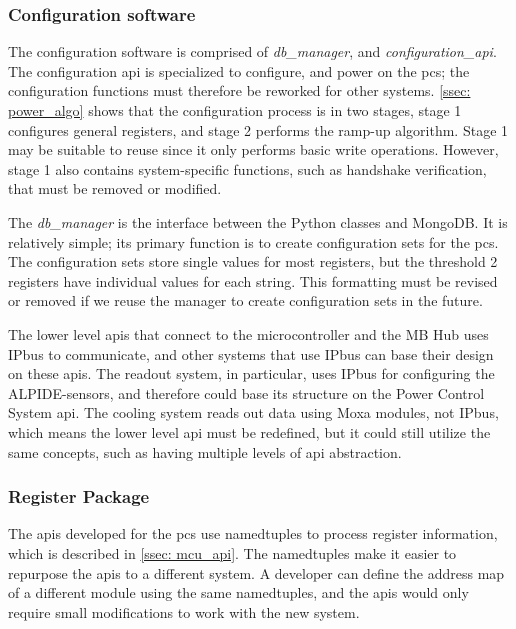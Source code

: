 \documentclass[main.tex]{subfiles}
\begin{document}
\subsubsection{Configuration software}

The configuration software is comprised of \textit{db\_manager}, and \textit{configuration\_api}. The configuration \gls{api} is specialized to configure, and power on the \gls{pcs}; the configuration functions must therefore be reworked for other systems. \autoref{ssec: power_algo} shows that the configuration process is in two stages, stage 1 configures general registers, and stage 2 performs the ramp-up algorithm. Stage 1 may be suitable to reuse since it only performs basic write operations. However, stage 1 also contains system-specific functions, such as handshake verification, that must be removed or modified.

The \textit{db\_manager} is the interface between the Python classes and MongoDB. It is relatively simple; its primary function is to create configuration sets for the \gls{pcs}. The configuration sets store single values for most registers, but the threshold 2 registers have individual values for each string. This formatting must be revised or removed if we reuse the manager to create configuration sets in the future. 

The lower level \gls{api}s that connect to the microcontroller and the MB Hub uses IPbus to communicate, and other systems that use IPbus can base their design on these \gls{api}s. The readout system, in particular, uses IPbus for configuring the ALPIDE-sensors, and therefore could base its structure on the Power Control System \gls{api}. The cooling system reads out data using Moxa modules, not IPbus, which means the lower level \gls{api} must be redefined, but it could still utilize the same concepts, such as having multiple levels of \gls{api} abstraction.
 
 \subsubsection{Register Package}
 
The \gls{api}s developed for the \gls{pcs} use namedtuples to process register information, which is described in \autoref{ssec: mcu_api}. The namedtuples make it easier to repurpose the \gls{api}s to a different system. A developer can define the address map of a different module using the same namedtuples, and the \gls{api}s would only require small modifications to work with the new system.
\end{document}
